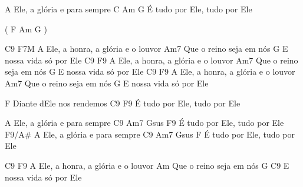   A Ele, a glória e para sempre
    C             Am      G   
  É tudo por Ele, tudo por Ele
  
  ( F  Am  G )
\endverse

\beginverse
   C9                              F7M
  A Ele, a honra, a glória e o louvor
                      Am7
  Que o reino seja em nós
     G              
  E nossa vida só por Ele
    C9                              F9
  A Ele, a honra, a glória e o louvor
                      Am7
  Que o reino seja em nós
     G              
  E nossa vida só por Ele
    C9                              F9
  A Ele, a honra, a glória e o louvor
                      Am7
  Que o reino seja em nós
     G              
  E nossa vida só por Ele
\endverse

\beginverse
F 
  Diante dEle nos rendemos
    C9                        F9 
  É tudo por Ele, tudo por Ele

  A Ele, a glória e para sempre
     C9           Am7      Gsus   F9
  É tudo por Ele, tudo por Ele
                    F9/A#
  A Ele, a glória e para sempre
     C9            Am7       Gsus   F
  É tudo por Ele, tudo por Ele
\endverse

\beginverse
    C9                              F9
  A Ele, a honra, a glória e o louvor
                      Am
  Que o reino seja em nós
     G                          C9
  E nossa vida só por Ele

\endverse

\endsong
